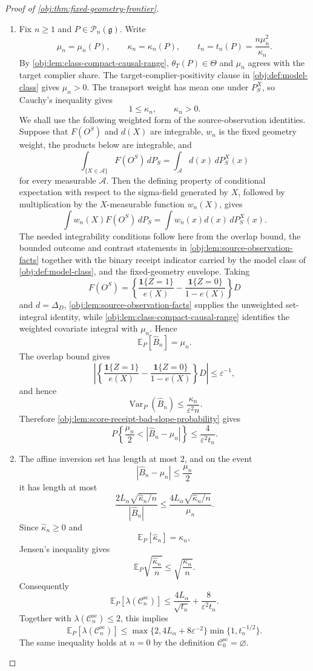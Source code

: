 \documentclass[11pt]{article}
\begin{document}
\begin{proof}[Proof of \cref{obj:thm:fixed-geometry-frontier}]
\begin{enumerate}
\item Fix \(n\ge1\) and \(P\in\mathcal P_n(\mathfrak g)\).  Write
\[
\mu_n=\mu_n(P),\qquad
\kappa_n=\kappa_n(P),\qquad
t_n=t_n(P)=\frac{n\mu_n^2}{\kappa_n}.
\]
By \cref{obj:lem:class-compact-causal-range}, \(\theta_T(P)\in\Theta\) and \(\mu_n\) agrees with the target complier share.  The target-complier-positivity clause in \cref{obj:def:model-class} gives \(\mu_n>0\).  The transport weight has mean one under \(P_S^X\), so Cauchy's inequality gives
\[
1\le \kappa_n,
\qquad
\kappa_n>0.
\]
We shall use the following weighted form of the source-observation identities.  Suppose that \(F(O^S)\) and \(d(X)\) are integrable, \(w_n\) is the fixed geometry weight, the products below are integrable, and
\[
\int_{\{X\in \mathcal A\}}F(O^S)\,dP_S
=
\int_{\mathcal A}d(x)\,dP_S^X(x)
\]
for every measurable \(\mathcal A\).  Then the defining property of conditional expectation with respect to the sigma-field generated by \(X\), followed by multiplication by the \(X\)-measurable function \(w_n(X)\), gives
\[
\int w_n(X)F(O^S)\,dP_S
=
\int w_n(x)d(x)\,dP_S^X(x).
\]
The needed integrability conditions follow here from the overlap bound, the bounded outcome and contrast statements in \cref{obj:lem:source-observation-facts} together with the binary receipt indicator carried by the model class of \cref{obj:def:model-class}, and the fixed-geometry envelope.  Taking
\[
F(O^S)=
\left\{\frac{\mathbf 1\{Z=1\}}{e(X)}
-
\frac{\mathbf 1\{Z=0\}}{1-e(X)}
\right\}D
\]
and \(d=\Delta_D\), \cref{obj:lem:source-observation-facts} supplies the unweighted set-integral identity, while \cref{obj:lem:class-compact-causal-range} identifies the weighted covariate integral with \(\mu_n\).  Hence
\[
\mathbb E_P[\widehat B_n]=\mu_n .
\]
The overlap bound gives
\[
\left|
\left\{\frac{\mathbf 1\{Z=1\}}{e(X)}
-
\frac{\mathbf 1\{Z=0\}}{1-e(X)}
\right\}D
\right|
\le
\varepsilon^{-1},
\]
and hence
\[
\operatorname{Var}_P(\widehat B_n)
\le
\frac{\kappa_n}{\varepsilon^2 n}.
\]
Therefore \cref{obj:lem:score-receipt-bad-slope-probability} gives
\[
P\left\{\frac{\mu_n}{2}<|\widehat B_n-\mu_n|\right\}
\le
\frac{4}{\varepsilon^2 t_n}.
\]

\item The affine inversion set has length at most \(2\), and on the event
\[
|\widehat B_n-\mu_n|\le \frac{\mu_n}{2}
\]
it has length at most
\[
\frac{2L_\alpha\sqrt{\widehat\kappa_n/n}}{|\widehat B_n|}
\le
\frac{4L_\alpha\sqrt{\widehat\kappa_n/n}}{\mu_n}.
\]
Since \(\widehat\kappa_n\ge0\) and
\[
\mathbb E_P[\widehat\kappa_n]=\kappa_n,
\]
Jensen's inequality gives
\[
\mathbb E_P\sqrt{\frac{\widehat\kappa_n}{n}}
\le
\sqrt{\frac{\kappa_n}{n}}.
\]
Consequently
\[
\mathbb E_P[\lambda(\mathscr C_n^{\mathrm{sc}})]
\le
\frac{4L_\alpha}{\sqrt{t_n}}
+
\frac{8}{\varepsilon^2t_n}.
\]
Together with \(\lambda(\mathscr C_n^{\mathrm{sc}})\le2\), this implies
\[
\mathbb E_P[\lambda(\mathscr C_n^{\mathrm{sc}})]
\le
\max\{2,4L_\alpha+8\varepsilon^{-2}\}
\min\{1,t_n^{-1/2}\}.
\]
The same inequality holds at \(n=0\) by the definition \(\mathscr C_0^{\mathrm{sc}}=\varnothing\).


\end{enumerate}
\end{proof}
\end{document}
